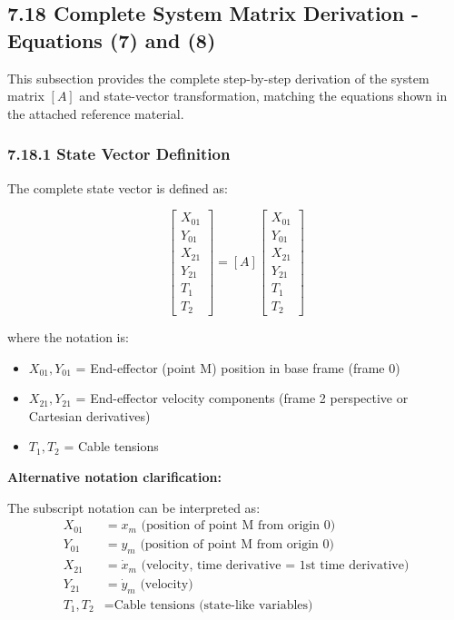 \subsection{7.18 Complete System Matrix Derivation - Equations (7) and (8)}

This subsection provides the complete step-by-step derivation of the system matrix $[A]$ and state-vector transformation, matching the equations shown in the attached reference material.

\subsubsection{7.18.1 State Vector Definition}

The complete state vector is defined as:

\begin{equation}
\boxed{\begin{bmatrix}
X_{01} \\
Y_{01} \\
X_{21} \\
Y_{21} \\
T_1 \\
T_2
\end{bmatrix} = [A] \begin{bmatrix}
X_{01} \\
Y_{01} \\
X_{21} \\
Y_{21} \\
T_1 \\
T_2
\end{bmatrix}}
\end{equation}

where the notation is:
\begin{itemize}
    \item $X_{01}, Y_{01}$ = End-effector (point M) position in base frame (frame 0)
    \item $X_{21}, Y_{21}$ = End-effector velocity components (frame 2 perspective or Cartesian derivatives)
    \item $T_1, T_2$ = Cable tensions
\end{itemize}

\textbf{Alternative notation clarification:}

The subscript notation can be interpreted as:
\begin{align}
X_{01} &= x_m \text{ (position of point M from origin 0)} \\
Y_{01} &= y_m \text{ (position of point M from origin 0)} \\
X_{21} &= \dot{x}_m \text{ (velocity, time derivative = 1st time derivative)} \\
Y_{21} &= \dot{y}_m \text{ (velocity)} \\
T_1, T_2 &= \text{Cable tensions (state-like variables)}
\end{align}

